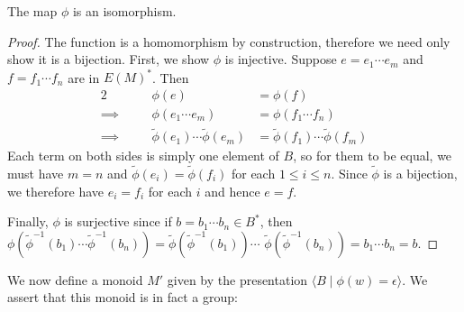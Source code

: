 \documentclass[noindex,noinsetproof,12pt]{lmaths}
\begin{document}
\begin{lemma}
	The map $\phi$ is an isomorphism.
\end{lemma}
\begin{proof}
	The function is a homomorphism by construction, therefore we need only show it is a bijection. First, we show $\phi$ is injective. Suppose $e = e_1\cdots e_m$ and $f = f_1\cdots f_n$ are in $E(M)^*$. Then
	\begin{alignat*}{2}
		&& \phi(e) &= \phi(f) \\
		\implies\quad&& \phi(e_1 \cdots e_m) &= \phi(f_1 \cdots f_n) \\
		\implies\quad&& \tilde\phi(e_1)\cdots\tilde\phi(e_m) &= \tilde\phi(f_1)\cdots\tilde\phi(f_m)
	\end{alignat*}
	Each term on both sides is simply one element of $B$, so for them to be equal, we must have $m = n$ and $\tilde\phi(e_i) = \tilde\phi(f_i)$ for each $1 \le i \le n$. Since $\tilde\phi$ is a bijection, we therefore have $e_i = f_i$ for each $i$ and hence $e = f$.

	Finally, $\phi$ is surjective since if $b = b_1 \cdots b_n \in B^*$, then $\phi(\tilde\phi^{-1}(b_1) \cdots \tilde\phi^{-1}(b_n)) = \tilde\phi(\tilde\phi^{-1}(b_1)) \cdots$ $\tilde\phi(\tilde\phi^{-1}(b_n)) = b_1$$\cdots b_n = b$.
\end{proof}

We now define a monoid $M'$ given by the presentation $\langle B \mid \phi(w) = \epsilon \rangle$. We assert that this monoid is in fact a group:
\end{document}
